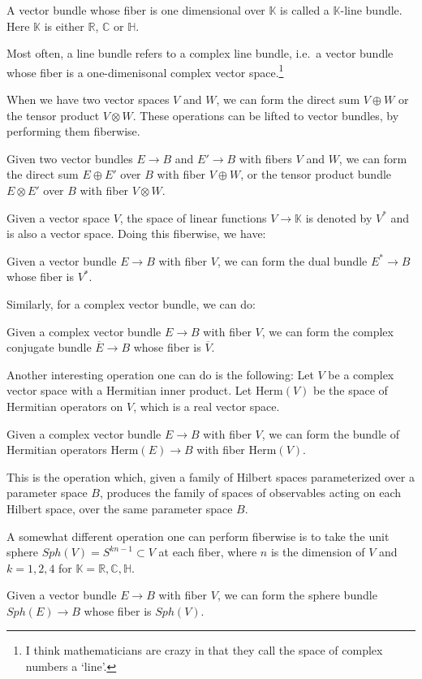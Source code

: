 \documentclass[12pt]{article}
\numberwithin{equation}{section}
\def\bC{\mathbb{C}}
\def\bH{\mathbb{H}}
\def\bK{\mathbb{K}}
\def\bR{\mathbb{R}}
\let\bar\overline
\begin{document}
\begin{definition}
A vector bundle whose fiber is one dimensional over $\bK$ is called a 
$\bK$-line bundle.
Here $\bK$ is either $\bR$, $\bC$ or $\bH$.
\end{definition}
Most often, a line bundle refers to a complex line bundle, i.e.~a vector bundle
whose fiber is a one-dimenisonal complex vector space.\footnote{%
I think mathematicians are crazy in that they call the space of complex numbers a `line'.
}

When we have two vector spaces $V$ and $W$,
we can form the direct sum $V\oplus W$ or the tensor product $V\otimes W$.
These operations can be lifted to vector bundles,
by performing them fiberwise.
\begin{definition}
  Given two vector bundles $E\to B$ and $E'\to B$ with fibers $V$ and $W$,
  we can form the direct sum $E\oplus E'$ over $B$ with fiber $V\oplus W$,
  or the tensor product bundle $E\otimes E'$ over $B$ with fiber $V\otimes W$.  
\end{definition}

Given a vector space $V$, the space of linear functions $V\to \bK$ is denoted by $V^*$
and is also a  vector space.
Doing this fiberwise, we have:
\begin{definition}
  Given a vector bundle $E\to B$ with fiber $V$,
  we can form the dual bundle $E^*\to B$ whose fiber is $V^*$.
\end{definition}
Similarly, for a complex vector bundle, we can do:
\begin{definition}
  Given a complex vector bundle $E\to B$ with fiber $V$,
  we can form the complex conjugate bundle $\bar E\to B$ whose fiber is $\bar V$.
\end{definition}


Another interesting operation one can do is the following:
Let $V$ be a complex vector space with a Hermitian inner product.
Let $\mathrm{Herm}(V)$ be the space of Hermitian operators on $V$,
which is a real vector space.
\begin{definition}
  Given a complex vector bundle $E\to B$ with fiber $V$,
  we can form the bundle of Hermitian operators $\mathrm{Herm}(E)\to B$ with fiber $\mathrm{Herm}(V)$.
\end{definition}
This is the operation which, given a family of Hilbert spaces parameterized over 
a parameter space $B$,
produces the family of spaces of observables acting on each Hilbert space, over the same parameter space $B$.

A somewhat different operation one can perform fiberwise 
is to take the unit sphere $Sph(V)=S^{kn-1} \subset V$ at each fiber, where $n$ is the dimension of $V$
and $k=1,2,4$ for $\bK=\bR,\bC,\bH$.
\begin{definition}
  Given a vector bundle $E\to B$ with fiber $V$,
  we can form the sphere bundle $Sph(E)\to B$ whose fiber is $Sph(V)$.
\end{definition}
\end{document}
